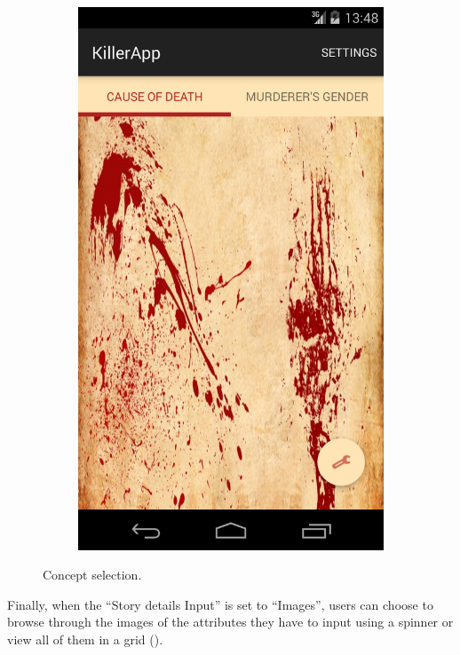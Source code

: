 \documentclass{mproj}
\begin{document}
\begin{figure}[h]
\begin{subfigure}{0.3\textwidth}
	\end{subfigure}		
	\quad
	\begin{subfigure}{0.3\textwidth}
		\includegraphics[width=\textwidth]{images/class_tabs}
	\end{subfigure}			
	\caption{Concept selection.}
	\label{fig:concept_selection}
\end{figure}

Finally, when the ``Story details Input'' is set to ``Images'', users can choose to browse through the images of the attributes they have to input using a spinner or view all of them in a grid ().
\end{document}
